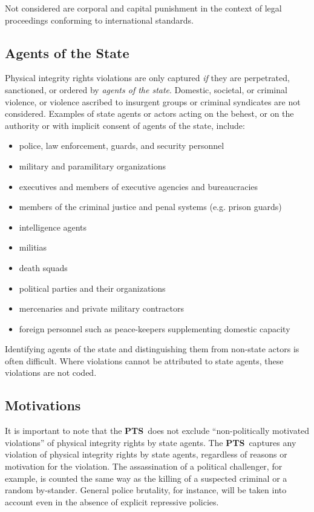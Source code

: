 \documentclass[11pt]{report}
\newcommand{\PTS}{\textsf{\textbf{PTS}}}
\begin{document}
\noindent Not considered are corporal and capital punishment in the context of legal proceedings conforming to international standards.

\subsection*{Agents of the State}

Physical integrity rights violations are only captured \textit{if} they are perpetrated, sanctioned, or ordered by \textit{agents of the state}. Domestic, societal, or criminal violence, or violence ascribed to insurgent groups or criminal syndicates are not considered. Examples of state agents or actors acting on the behest, or on the authority or with implicit consent of agents of the state, include:

\begin{itemize}
  \item police, law enforcement, guards, and security personnel 
  \item military and paramilitary organizations
  \item executives and members of executive agencies and bureaucracies
  \item members of the criminal justice and penal systems (e.g. prison guards)
  \item intelligence agents
  \item militias
  \item death squads
  \item political parties and their organizations
  \item mercenaries and private military contractors
  \item foreign personnel such as peace-keepers supplementing domestic capacity
\end{itemize}

\noindent Identifying agents of the state and distinguishing them from non-state actors is often difficult. Where violations cannot be attributed to state agents, these violations are not coded. 

\subsection*{Motivations}

It is important to note that the \PTS~does not exclude ``non-politically motivated violations'' of physical integrity rights by state agents. The \PTS~captures any violation of physical integrity rights by state agents, regardless of reasons or motivation for the violation. The assassination of a political challenger, for example, is counted the same way as the killing of a suspected criminal or a random by-stander. General police brutality, for instance, will be taken into account even in the absence of explicit repressive policies.\\  
\end{document}
